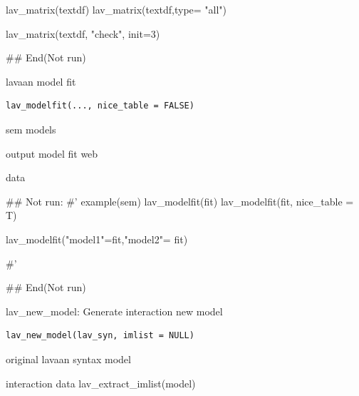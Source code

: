 \documentclass[a4paper]{book}
\begin{document}
\begin{Examples}
\begin{ExampleCode}
lav_matrix(textdf)
lav_matrix(textdf,type= "all")

lav_matrix(textdf, "check", init=3)



## End(Not run)

\end{ExampleCode}
\end{Examples}
%
\begin{Description}
lavaan model fit
\end{Description}
%
\begin{Usage}
\begin{verbatim}
lav_modelfit(..., nice_table = FALSE)
\end{verbatim}
\end{Usage}
%
\begin{Arguments}
\begin{ldescription}
\item[\code{...}] sem models

\item[\code{nice\_table}] output model fit web
\end{ldescription}
\end{Arguments}
%
\begin{Value}
data
\end{Value}
%
\begin{Examples}
\begin{ExampleCode}

## Not run: 
#'
example(sem)
lav_modelfit(fit)
lav_modelfit(fit, nice_table = T)

lav_modelfit("model1"=fit,"model2"= fit)

#'

## End(Not run)


\end{ExampleCode}
\end{Examples}
%
\begin{Description}
lav\_new\_model: Generate interaction new model
\end{Description}
%
\begin{Usage}
\begin{verbatim}
lav_new_model(lav_syn, imlist = NULL)
\end{verbatim}
\end{Usage}
%
\begin{Arguments}
\begin{ldescription}
\item[\code{lav\_syn}] original lavaan syntax model

\item[\code{imlist}] interaction data lav\_extract\_imlist(model)
\end{ldescription}
\end{Arguments}
\end{document}
